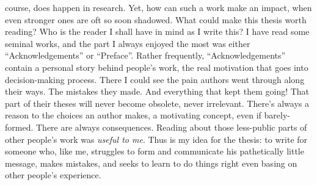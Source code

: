 course, does happen in research. Yet, how can such a work make an impact, when
even stronger ones are oft so soon shadowed.
What could make this thesis worth reading? Who is the reader I shall have in
mind as I write this? I have read some seminal works, and the part I always
enjoyed the most was either ``Acknowledgements'' or ``Preface''.  Rather
frequently, ``Acknowledgements'' contain a personal story behind people's work,
the real motivation that goes into decision-making process.  There I could see
the pain authors went through along their ways. The mistakes they made. And
everything that kept them going! That part of their theses will never
become obsolete, never irrelevant. There's always a reason to the choices
an author makes, a motivating concept, even if barely-formed. There are always
consequences. Reading about those less-public parts of other people's work was
\emph{useful to me}. Thus is my idea for the thesis: to write for someone who,
like me, struggles to form and communicate his pathetically little message,
makes mistakes, and seeks to learn to do things right even basing on other
people's experience.

